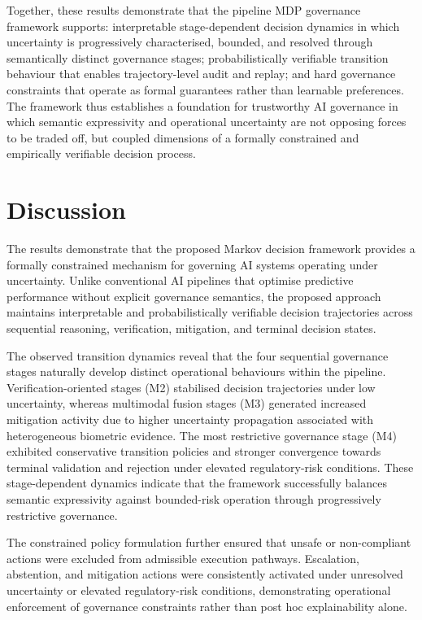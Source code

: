 \documentclass{article}
\begin{document}
Together, these results demonstrate that the pipeline MDP governance framework supports: interpretable stage-dependent decision dynamics in which uncertainty is progressively characterised, bounded, and resolved through semantically distinct governance stages; probabilistically verifiable transition behaviour that enables trajectory-level audit and replay; and hard governance constraints that operate as formal guarantees rather than learnable preferences. The framework thus establishes a foundation for trustworthy AI governance in which semantic expressivity and operational uncertainty are not opposing forces to be traded off, but coupled dimensions of a formally constrained and empirically verifiable decision process.



\section{Discussion}

The results demonstrate that the proposed Markov decision framework provides a formally constrained mechanism for governing AI systems operating under uncertainty. Unlike conventional AI pipelines that optimise predictive performance without explicit governance semantics, the proposed approach maintains interpretable and probabilistically verifiable decision trajectories across sequential reasoning, verification, mitigation, and terminal decision states.

The observed transition dynamics reveal that the four sequential governance stages naturally develop distinct operational behaviours within the pipeline. Verification-oriented stages (M2) stabilised decision trajectories under low uncertainty, whereas multimodal fusion stages (M3) generated increased mitigation activity due to higher uncertainty propagation associated with heterogeneous biometric evidence. The most restrictive governance stage (M4) exhibited conservative transition policies and stronger convergence towards terminal validation and rejection under elevated regulatory-risk conditions. These stage-dependent dynamics indicate that the framework successfully balances semantic expressivity against bounded-risk operation through progressively restrictive governance.

The constrained policy formulation further ensured that unsafe or non-compliant actions were excluded from admissible execution pathways. Escalation, abstention, and mitigation actions were consistently activated under unresolved uncertainty or elevated regulatory-risk conditions, demonstrating operational enforcement of governance constraints rather than post hoc explainability alone.
\end{document}
